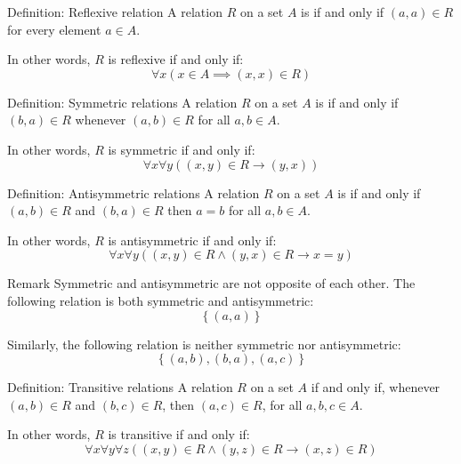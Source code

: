 \documentclass[a4paper]{article}
\begin{document}
\begin{parag}{Definition: Reflexive relation}
    A relation $R$ on a set $A$ is  if and only if $\left(a, a\right) \in R$ for every element $a \in A$.
    
    In other words, $R$ is reflexive if and only if: 
    \[\forall x\left(x \in A \implies \left(x, x\right) \in R\right)\]
\end{parag}

\begin{parag}{Definition: Symmetric relations}
    A relation $R$ on a set $A$ is  if and only if $\left(b, a\right) \in R$ whenever $\left(a, b\right) \in R$ for all $a, b \in A$.

    In other words, $R$ is symmetric if and only if: 
    \[\forall x \forall y \left(\left(x, y\right) \in R \to \left(y, x\right)\right)\]
\end{parag}

\begin{parag}{Definition: Antisymmetric relations}
    A relation $R$ on a set $A$ is  if and only if $\left(a, b\right) \in R$ and $\left(b, a\right) \in R$ then $a = b$ for all $a, b \in A$.

    In other words, $R$ is antisymmetric if and only if: 
    \[\forall x \forall y \left(\left(x, y\right) \in R \land \left(y, x\right) \in R \to x = y\right)\]
    
    \begin{subparag}{Remark}
        Symmetric and antisymmetric are not opposite of each other. The following relation is both symmetric and antisymmetric: 
        \[\left\{\left(a, a\right)\right\}\]
        
        Similarly, the following relation is neither symmetric nor antisymmetric: 
        \[\left\{\left(a, b\right), \left(b, a\right), \left(a, c\right)\right\}\]
    \end{subparag}
\end{parag}

\begin{parag}{Definition: Transitive relations}
    A relation $R$ on a set $A$  if and only if, whenever $\left(a, b\right) \in R$ and $\left(b, c\right) \in R$, then $\left(a, c\right) \in R$, for all $a, b, c \in A$.

    In other words, $R$ is transitive if and only if: 
    \[\forall x \forall y \forall z\left(\left(x, y\right) \in R \land \left(y, z\right) \in R \to \left(x, z\right) \in R\right)\]
\end{parag}
\end{document}
